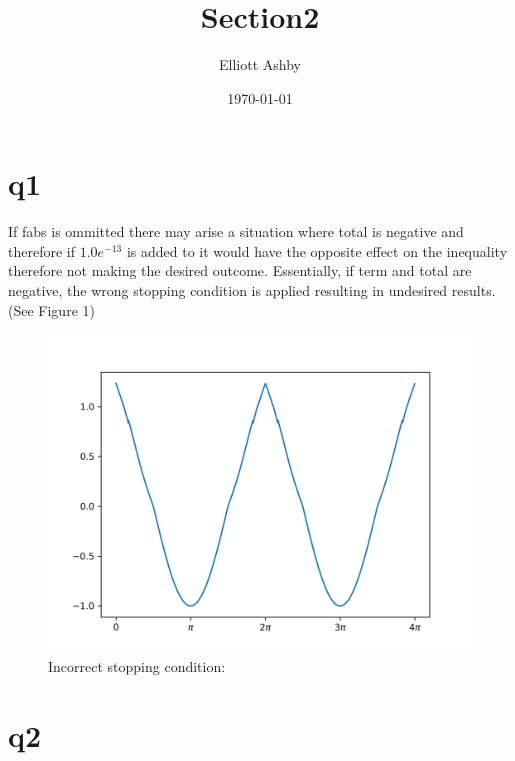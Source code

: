 \documentclass[a4paper,english]{article}
\title{Section2}
\author{Elliott Ashby}
\date{\today}
\begin{document}
    \maketitle
    \section{q1}
        If fabs is ommitted there may arise a situation where total is negative and therefore
        if $1.0e^{-13}$ is added to it would have the opposite effect on the inequality therefore
        not making the desired outcome. Essentially, if term and total are negative, the wrong 
        stopping condition is applied resulting in undesired results. (See Figure 1)
        \begin{figure}
            \caption{Incorrect stopping condition:}
            \includegraphics[scale=1]{./q1nofabs.png}
        \end{figure}
    \section{q2}
        
\end{document}
